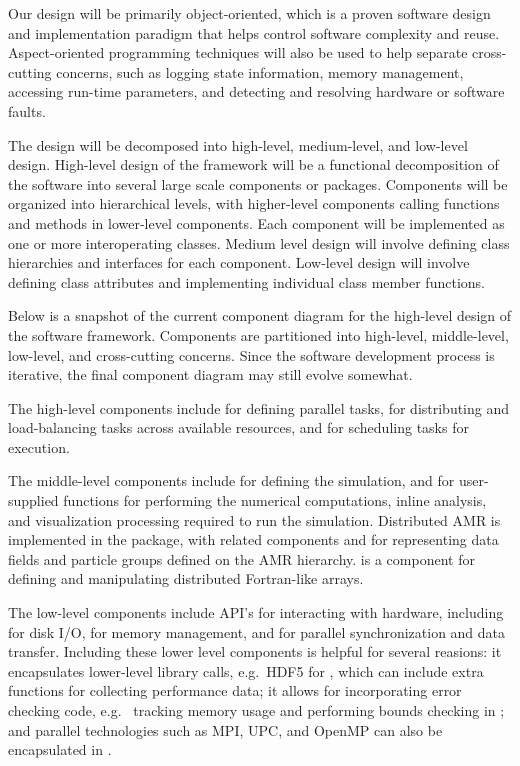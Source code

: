 \documentclass{article}
\begin{document}
Our design will be primarily object-oriented, which is a proven
software design and implementation paradigm that helps control
software complexity and reuse.  Aspect-oriented programming techniques
will also be used to help separate cross-cutting concerns, such as
logging state information, memory management, accessing run-time
parameters, and detecting and resolving hardware or software faults.

The design will be decomposed into high-level, medium-level,
and low-level design.  High-level design of the framework will be a
functional decomposition of the software into several large scale
components or packages.  Components will be organized into
hierarchical levels, with higher-level components calling functions
and methods in lower-level components.  Each component will be
implemented as one or more interoperating classes.  Medium level
design will involve defining class hierarchies and interfaces for each
component.  Low-level design will involve defining class attributes
and implementing individual class member functions.

Below is a snapshot of the current component diagram for the
high-level design of the software framework.  Components are
partitioned into high-level, middle-level, low-level, and
cross-cutting concerns.  Since the software development process is
iterative, the final component diagram may still evolve somewhat.


The high-level components include  for defining parallel
tasks,  for distributing and load-balancing tasks
across available resources, and  for scheduling tasks
for execution.

The middle-level components include  for defining the
simulation, and  for user-supplied functions for
performing the numerical computations, inline analysis, and
visualization processing required to run the simulation.  Distributed
AMR is implemented in the  package, with related components
 and  for representing data fields and
particle groups defined on the AMR hierarchy.   is a
component for defining and manipulating distributed Fortran-like
arrays.

The low-level components include API's for interacting with hardware,
including  for disk I/O,  for memory
management, and  for parallel synchronization and data
transfer.  Including these lower level components is helpful for
several reasions: it encapsulates lower-level library calls, e.g.~HDF5
for , which can include extra functions for collecting
performance data; it allows for incorporating error checking code,
e.g.~ tracking memory usage and performing bounds checking in
; and parallel technologies such as MPI, UPC, and OpenMP
can also be encapsulated in .
\end{document}

